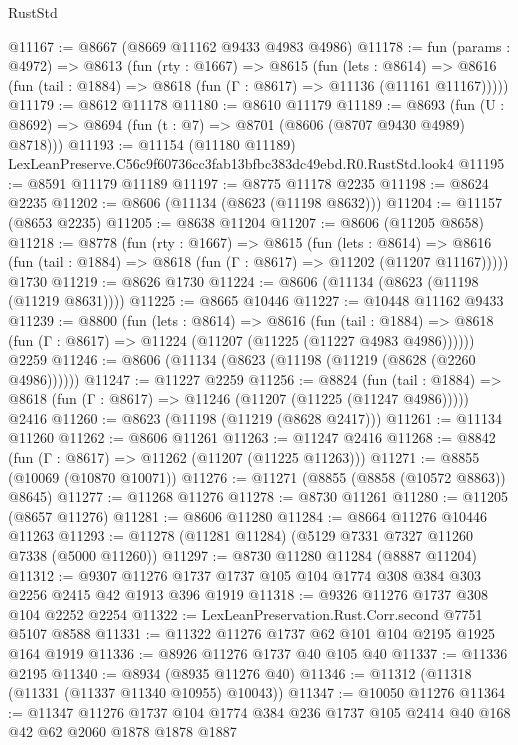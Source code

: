 \begin{lexlean}{RustStd}
\begin{coremodule}
@11167 := @8667 (@8669 @11162 @9433 @4983 @4986)
@11178 := fun (params : @4972) =>
  @8613
    (fun (rty : @1667) =>
    @8615
      (fun (lets : @8614) =>
      @8616 (fun (tail : @1884) => @8618 (fun (Γ : @8617) => @11136 (@11161 @11167)))))
@11179 := @8612 @11178
@11180 := @8610 @11179
@11189 := @8693 (fun (U : @8692) => @8694 (fun (t : @7) => @8701 (@8606 (@8707 @9430 @4989) @8718)))
@11193 := @11154 (@11180 @11189) LexLeanPreserve.C56c9f60736cc3fab13bfbc383dc49ebd.R0.RustStd.look4
@11195 := @8591 @11179 @11189
@11197 := @8775 @11178 @2235
@11198 := @8624 @2235
@11202 := @8606 (@11134 (@8623 (@11198 @8632)))
@11204 := @11157 (@8653 @2235)
@11205 := @8638 @11204
@11207 := @8606 (@11205 @8658)
@11218 := @8778
    (fun (rty : @1667) =>
    @8615
      (fun (lets : @8614) =>
      @8616 (fun (tail : @1884) => @8618 (fun (Γ : @8617) => @11202 (@11207 @11167)))))
    @1730
@11219 := @8626 @1730
@11224 := @8606 (@11134 (@8623 (@11198 (@11219 @8631))))
@11225 := @8665 @10446
@11227 := @10448 @11162 @9433
@11239 := @8800
    (fun (lets : @8614) =>
    @8616
      (fun (tail : @1884) =>
      @8618 (fun (Γ : @8617) => @11224 (@11207 (@11225 (@11227 @4983 @4986))))))
    @2259
@11246 := @8606 (@11134 (@8623 (@11198 (@11219 (@8628 (@2260 @4986))))))
@11247 := @11227 @2259
@11256 := @8824
    (fun (tail : @1884) => @8618 (fun (Γ : @8617) => @11246 (@11207 (@11225 (@11247 @4986)))))
    @2416
@11260 := @8623 (@11198 (@11219 (@8628 @2417)))
@11261 := @11134 @11260
@11262 := @8606 @11261
@11263 := @11247 @2416
@11268 := @8842 (fun (Γ : @8617) => @11262 (@11207 (@11225 @11263)))
@11271 := @8855 (@10069 (@10870 @10071))
@11276 := @11271 (@8855 (@8858 (@10572 @8863)) @8645)
@11277 := @11268 @11276
@11278 := @8730 @11261
@11280 := @11205 (@8657 @11276)
@11281 := @8606 @11280
@11284 := @8664 @11276 @10446 @11263
@11293 := @11278 (@11281 @11284) (@5129 @7331 @7327 @11260 @7338 (@5000 @11260))
@11297 := @8730 @11280 @11284 (@8887 @11204)
@11312 := @9307 @11276 @1737 @1737 @105 @104 @1774 @308 @384 @303 @2256 @2415 @42 @1913 @396 @1919
@11318 := @9326 @11276 @1737 @308 @104 @2252 @2254
@11322 := LexLeanPreservation.Rust.Corr.second @7751 @5107 @8588
@11331 := @11322 @11276 @1737 @62 @101 @104 @2195 @1925 @164 @1919
@11336 := @8926 @11276 @1737 @40 @105 @40
@11337 := @11336 @2195
@11340 := @8934 (@8935 @11276 @40)
@11346 := @11312 (@11318 (@11331 (@11337 @11340 @10955) @10043))
@11347 := @10050 @11276
@11364 := @11347
    @11276
    @1737
    @104
    @1774
    @384
    @236
    @1737
    @105
    @2414
    @40
    @168
    @42
    @62
    @2060
    @1878
    @1878
    @1887

\end{coremodule}
\end{lexlean}
